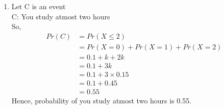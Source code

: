 \documentclass[journal,12pt,twocolumn]{IEEEtran}
\renewcommand\thesection{\arabic{section}}
\begin{document}
\begin{enumerate}[label=\arabic*.,ref=\thesection.\theenumi]
\begin{enumerate}
            \item 
             Let C is an event \\
             C: You study atmost two hours \\
             So, 
             \begin{align}
                Pr(C)  &= Pr(X\leq 2) \\
                       &= Pr(X=0) + Pr(X=1) + Pr(X=2) \\
                       &= 0.1 + k + 2k \\
                       &= 0.1 + 3k \\
                       &= 0.1 + 3\times 0.15 \\
                       &= 0.1 + 0.45 \\
                       &= 0.55
            \end{align}
            Hence, probability of you study atmost two hours is 0.55. \\
        \end{enumerate}
        
    \end{enumerate}
    
\end{document}
